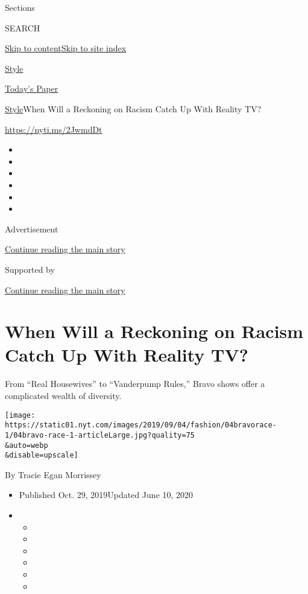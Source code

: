 Sections

SEARCH

\protect\hyperlink{site-content}{Skip to
content}\protect\hyperlink{site-index}{Skip to site index}

\href{https://www.nytimes.com/section/style}{Style}

\href{https://myaccount.nytimes.com/auth/login?response_type=cookie\&client_id=vi}{}

\href{https://www.nytimes.com/section/todayspaper}{Today's Paper}

\href{/section/style}{Style}\textbar{}When Will a Reckoning on Racism
Catch Up With Reality TV?

\href{https://nyti.ms/2JwmdDt}{https://nyti.ms/2JwmdDt}

\begin{itemize}
\item
\item
\item
\item
\item
\item
\end{itemize}

Advertisement

\protect\hyperlink{after-top}{Continue reading the main story}

Supported by

\protect\hyperlink{after-sponsor}{Continue reading the main story}

\hypertarget{when-will-a-reckoning-on-racism-catch-up-with-reality-tv}{%
\section{When Will a Reckoning on Racism Catch Up With Reality
TV?}\label{when-will-a-reckoning-on-racism-catch-up-with-reality-tv}}

From ``Real Housewives'' to ``Vanderpump Rules,'' Bravo shows offer a
complicated wealth of diversity.

\texttt{[image: https://static01.nyt.com/images/2019/09/04/fashion/04bravorace-1/04bravo-race-1-articleLarge.jpg?quality=75\\\&auto=webp\\\&disable=upscale]}

By Tracie Egan Morrissey

\begin{itemize}
\item
  Published Oct. 29, 2019Updated June 10, 2020
\item
  \begin{itemize}
  \item
  \item
  \item
  \item
  \item
  \item
  \end{itemize}
\end{itemize}

